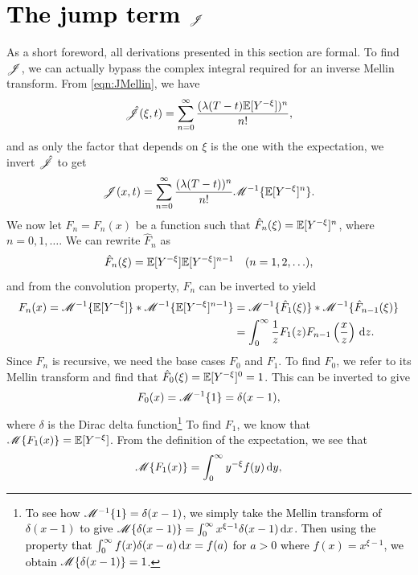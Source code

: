 \section{\textcolor{black}{The jump term $\mathscr J$}}
As a short foreword, all derivations presented in this section are formal. To find $\mathscr J$, we can actually bypass the complex integral required for an inverse Mellin transform. From \eqref{eqn:JMellin}, we have
	\begin{align*}
		\hat {\mathscr J}(\xi,t) = \displaystyle\sum\limits_{n=0}^{\infty} \frac{(\lambda(T-t)\mathbb E[Y^{-\xi}])^n}{n!},
	\end{align*}
and as only the factor that depends on $\xi$ is the one with the expectation, we invert $\hat {\mathscr J}$ to get
	\begin{equation}
		\label{eqn:Jhat}
		\mathscr J(x,t) = \displaystyle\sum\limits_{n=0}^{\infty} \frac{(\lambda(T-t))^n}{n!}\mathscr M^{-1}\{ \mathbb E[Y^{-\xi}]^n \}.
	\end{equation}
We now let $F_n = F_n(x)$ be a function such that $\hat F_n(\xi) = \mathbb E[Y^{-\xi}]^n$, where $ n = 0, 1, \ldots$. We can rewrite $\hat F_n$ as
	\begin{equation*}
		\hat F_n(\xi) = \mathbb E[Y^{-\xi}] \mathbb E[Y^{-\xi}]^{n-1} \quad (n = 1,2,\ldots),
	\end{equation*}
and from the convolution property, $\hat F_n$ can be inverted to yield
	\begin{align*}
		F_n(x) = \mathscr M^{-1} \{ \mathbb E[Y^{-\xi}] \} \ast \mathscr M^{-1} \{ \mathbb E[Y^{-\xi}]^{n-1} \} &= \mathscr M^{-1}\{ \hat F_1(\xi) \} \ast \mathscr M^{-1}\{ \hat F_{n-1}(\xi) \} \\
		&= \int_0^\infty \frac{1}{z} F_1(z)F_{n-1}\left( \frac{x}{z} \right) \, \mathrm d z.
	\end{align*}
Since $F_n$ is recursive, we need the base cases $F_0$ and $F_1$. To find $F_0$, we refer to its Mellin transform and find that $\hat F_0(\xi) = \mathbb E[Y^{-\xi}]^0 = 1$. This can be inverted to give
	\begin{equation*}
		F_0(x) = \mathscr M^{-1}\{ 1 \} = \delta(x-1),
	\end{equation*}
where $\delta$ is the Dirac delta function\footnote{\textcolor{black}{To see how $\mathscr M^{-1}\{1\} = \delta(x-1)$, we simply take the Mellin transform of $\delta(x-1)$ to give $\mathscr M\{\delta(x-1)\} = \int_0^\infty x^{\xi-1}\delta(x-1) \, \mathrm d x$. Then using the property that $\int_0^\infty f(x)\delta(x-a) \, \mathrm d x = f(a)$ for $a > 0$ where $f(x) = x^{\xi-1}$, we obtain $\mathscr M\{\delta(x-1)\} = 1$.}}
To find $F_1$, we know that $\mathscr M \{ F_1(x) \} = \mathbb E[Y^{-\xi}]$. From the definition of the expectation, we see that\begin{equation*}
		\mathscr M \{ F_1(x) \} = \int_0^\infty y^{-\xi} f(y) \, \mathrm d y,
	\end{equation*}
